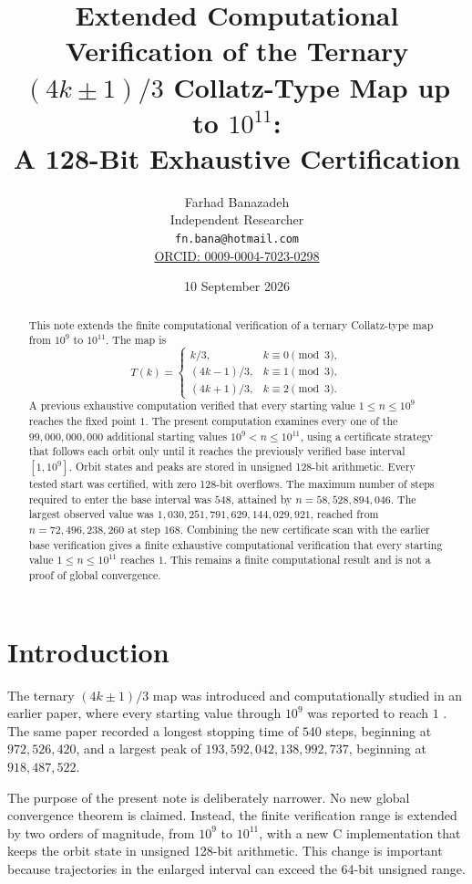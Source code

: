\documentclass[11pt]{article}
\title{Extended Computational Verification of the Ternary $(4k\pm1)/3$ Collatz-Type Map up to $10^{11}$:\\A 128-Bit Exhaustive Certification}
\author{Farhad Banazadeh\\Independent Researcher\\\texttt{fn.bana@hotmail.com}\\\href{https://orcid.org/0009-0004-7023-0298}{ORCID: 0009-0004-7023-0298}}
\date{10 September 2026}
\begin{document}
\maketitle

\begin{abstract}
This note extends the finite computational verification of a ternary Collatz-type map from $10^9$ to $10^{11}$. The map is
\[
T(k)=\begin{cases}
k/3,&k\equiv0\pmod3,\\
(4k-1)/3,&k\equiv1\pmod3,\\
(4k+1)/3,&k\equiv2\pmod3.
\end{cases}
\]
A previous exhaustive computation verified that every starting value $1\le n\le10^9$ reaches the fixed point $1$. The present computation examines every one of the $99,000,000,000$ additional starting values $10^9<n\le10^{11}$, using a certificate strategy that follows each orbit only until it reaches the previously verified base interval $[1,10^9]$. Orbit states and peaks are stored in unsigned 128-bit arithmetic. Every tested start was certified, with zero 128-bit overflows. The maximum number of steps required to enter the base interval was $548$, attained by $n=58,528,894,046$. The largest observed value was $1,030,251,791,629,144,029,921$, reached from $n=72,496,238,260$ at step $168$. Combining the new certificate scan with the earlier base verification gives a finite exhaustive computational verification that every starting value $1\le n\le10^{11}$ reaches $1$. This remains a finite computational result and is not a proof of global convergence.
\end{abstract}

\section{Introduction}
The ternary $(4k\pm1)/3$ map was introduced and computationally studied in an earlier paper, where every starting value through $10^9$ was reported to reach $1$ \cite{banazadeh-base}. The same paper recorded a longest stopping time of $540$ steps, beginning at $972,526,420$, and a largest peak of $193,592,042,138,992,737$, beginning at $918,487,522$.

The purpose of the present note is deliberately narrower. No new global convergence theorem is claimed. Instead, the finite verification range is extended by two orders of magnitude, from $10^9$ to $10^{11}$, with a new C implementation that keeps the orbit state in unsigned 128-bit arithmetic. This change is important because trajectories in the enlarged interval can exceed the 64-bit unsigned range.
\end{document}
